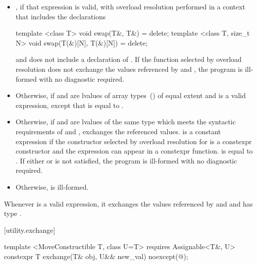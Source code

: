 \begin{itemize}
\item
  , if that expression is valid, with overload resolution
  performed in a context that includes the declarations
\begin{codeblock}
  template <class T>
  void swap(T&, T&) = delete;
  template <class T, size_t N>
  void swap(T(&)[N], T(&)[N]) = delete;
\end{codeblock}
  and does not include a declaration of .
  If the function selected by overload resolution does not
  exchange the values referenced by  and ,
  the program is ill-formed with no diagnostic required.

\item
  Otherwise,  if  and
   are lvalues of array types~()
  of equal extent and 
  is a valid expression, except that
   is equal to
  .

\item
  Otherwise, if  and  are lvalues of the
  same type  which meets the syntactic requirements of
   and
  , exchanges the referenced values.
   is a constant expression if
  the constructor selected by overload resolution for
   is a constexpr constructor and
  the expression  can appear in a
  constexpr function. 
  is equal to . If either
   or
   is not satisfied, the program
  is ill-formed with no diagnostic required.

\item
  Otherwise,  is ill-formed.
\end{itemize}

\pnum
\remark Whenever  is a valid
expression, it exchanges the values referenced by 
and  and has type .

[utility.exchange]{}

\begin{itemdecl}
template <MoveConstructible T, class U=T>
  requires Assignable<T&, U>
constexpr T exchange(T& obj, U&& new_val) noexcept(@\seebelow@);
\end{itemdecl}

